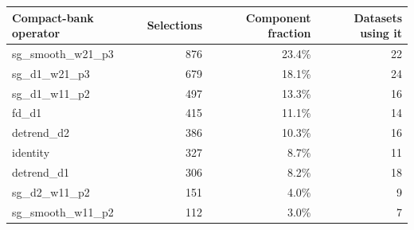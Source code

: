 \begin{tabularx}{\linewidth}{Xrrr}
\toprule
Compact-bank operator & Selections & Component fraction & Datasets using it \\
\midrule
sg\_\allowbreak{}smooth\_\allowbreak{}w21\_\allowbreak{}p3 & 876 & 23.4\% & 22 \\
sg\_\allowbreak{}d1\_\allowbreak{}w21\_\allowbreak{}p3 & 679 & 18.1\% & 24 \\
sg\_\allowbreak{}d1\_\allowbreak{}w11\_\allowbreak{}p2 & 497 & 13.3\% & 16 \\
fd\_\allowbreak{}d1 & 415 & 11.1\% & 14 \\
detrend\_\allowbreak{}d2 & 386 & 10.3\% & 16 \\
identity & 327 & 8.7\% & 11 \\
detrend\_\allowbreak{}d1 & 306 & 8.2\% & 18 \\
sg\_\allowbreak{}d2\_\allowbreak{}w11\_\allowbreak{}p2 & 151 & 4.0\% & 9 \\
sg\_\allowbreak{}smooth\_\allowbreak{}w11\_\allowbreak{}p2 & 112 & 3.0\% & 7 \\
\bottomrule
\end{tabularx}

